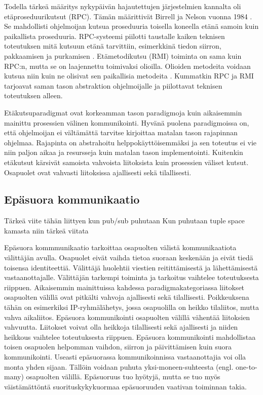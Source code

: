 Todella tärkeä määritys nykypäivän hajautettujen järjestelmien kannalta oli etäproseduurikutsut (RPC). Tämän määrittivät Birrell ja Nelson vuonna 1984 \cite{implemeting-remote-procedure-calls}. Se mahdollisti ohjelmoijan kutsua proseduuria toisella koneella etänä samoin kuin paikallista proseduuria. RPC-systeemi piilotti taustalle kaiken teknisen toteutuksen mitä kutsuun etänä tarvittiin, esimerkkinä tiedon siirron, pakkaamisen ja purkamisen \cite[s.~195--196]{distributed-systems-concepts-and-design}. Etämetodikutsu (RMI) toiminta on sama kuin RPC:n, mutta se on laajennettu toimivaksi olioilla. Olioiden metodeita voidaan kutsua niin kuin ne olisivat sen paikallisia metodeita \cite[s.~204]{distributed-systems-concepts-and-design}. Kummatkin RPC ja RMI tarjoavat saman tason abstraktion ohjelmoijalle ja piilottavat teknisen toteutuksen alleen.

Etäkutsuparadigmat ovat korkeamman tason paradigmoja kuin aikaisemmin mainittu prosessien välinen kommunikointi. Hyvänä puolena paradigmoissa on, että ohjelmoijan ei vältämättä tarvitse kirjoittaa matalan tason rajapinnan ohjelmaa. Rajapinta on abstrahoitu helppokäyttöisemmäksi ja sen toteutus ei vie niin paljon aikaa ja resursseja kuin matalan tason implementointi. Kuitenkin etäkutsut kärsivät samoista vahvoista liitoksista kuin prosessien väliset kutsut. Osapuolet ovat vahvasti liitoksissa ajallisesti sekä tilallisesti.


\subsection{Epäsuora kommunikaatio}
\label{ch:indirect-communication}
\begin{it}
	Tärkeä viite tähän liittyen kun pub/sub puhutaan \cite{distributed-event-based-systems}
	Kun puhutaan tuple space kamasta niin tärkeä viitata \cite{generative-communication-in-linda}
\end{it}
Epäsuora kommmunikaatio tarkoittaa osapuolten välistä kommunikaatiota välittäjän avulla. Osapuolet eivät vaihda tietoa suoraan keskenään ja eivät tiedä toisensa identiteettiä. Välittäjä huolehtii viestien reitittämisestä ja lähettämisestä vastaanottajalle. Välittäjän tarkempi toiminta ja tarkoitus vaihtelee toteutuksesta riippuen. Aikaisemmin mainittuissa kahdessa paradigmakategoriassa liitokset osapuolten välillä ovat pitkälti vahvoja ajallisesti sekä tilallisesti. Poikkeuksena tähän on esimerkiksi IP-ryhmälähetys, jossa osapuolilla on heikko tilaliitos, mutta vahva aikaliitos. Epäsuora kommunikointi osapuolten välillä vähentää liitoksien vahvuutta. Liitokset voivat olla heikkoja tilallisesti sekä ajallisesti ja niiden heikkous vaihtelee toteutuksesta riippuen. Epäsuora kommunikointi mahdollistaa toisen osapuolen helpomman vaihdon, siirron ja päivittämisen kuin suora kommunikointi. Useasti epäsuorassa kommunikoinnissa vastaanottajia voi olla monta yhden sijaan. Tällöin voidaan puhuta yksi-moneen-suhteesta (engl. one-to-many) osapuolten välillä. Epäsuoruus tuo hyötyjä, mutta se tuo myös väistämättöntä suorituskykykuormaa epäsuoruuden vaativan toiminnan takia. \mbox{\cite[s.~230--231]{distributed-systems-concepts-and-design}}

